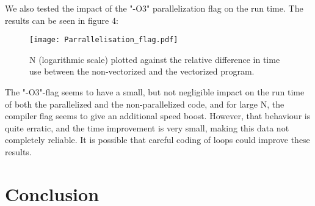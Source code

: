 \documentclass[10pt,a4paper]{article}
\begin{document}
We also tested the impact of the "-O3" parallelization flag on the run time. The results can be seen in figure 4:
\begin{figure}[H]
\centering
\texttt{[image: Parrallelisation\_flag.pdf]}
\caption[Vectorization flags]{N (logarithmic scale) plotted against the relative difference in time use between the non-vectorized and the vectorized program. }
\end{figure}
The "-O3"-flag seems to have a small, but not negligible impact on the run time of both the parallelized and the non-parallelized code, and for large N, the compiler flag seems to give an additional speed boost.
However, that behaviour is quite erratic, and the time improvement is very small, making this data not completely reliable. It is possible that careful coding of loops could improve these results.
\section{Conclusion}
\end{document}
